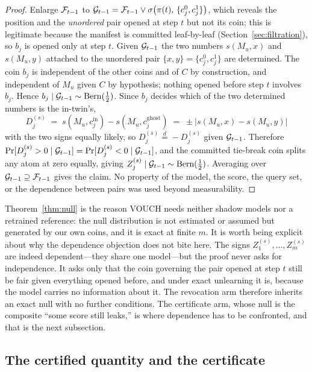 \begin{proof}
Enlarge $\mathcal{F}_{t-1}$ to $\mathcal{G}_{t-1} = \mathcal{F}_{t-1} \vee \sigma\bigl(\pi(t),\,
\{c_j^0, c_j^1\}\bigr)$, which reveals the position and the \emph{unordered} pair
opened at step $t$ but not its coin; this is legitimate because the manifest is
committed leaf-by-leaf (Section~\ref{sec:filtration}), so $b_j$ is opened only at
step $t$. Given $\mathcal{G}_{t-1}$ the two numbers $s(M_u, x)$ and $s(M_u, y)$ attached to
the unordered pair $\{x,y\}=\{c_j^0,c_j^1\}$ are determined. The coin $b_j$ is
independent of the other coins and of $C$ by construction, and independent of $M_u$
given $C$ by hypothesis; nothing opened before step $t$ involves $b_j$. Hence
$b_j \mid \mathcal{G}_{t-1} \sim \mathrm{Bern}(\tfrac12)$. Since $b_j$ decides which of the two
determined numbers is the in-twin's,
\[
D_j^{(s)} \;=\; s(M_u, c_j^{\text{in}}) - s(M_u, c_j^{\text{ghost}})
\;=\; \pm\bigl|s(M_u,x) - s(M_u,y)\bigr|
\]
with the two signs equally likely, so $D_j^{(s)} \overset{d}{=} -D_j^{(s)}$ given
$\mathcal{G}_{t-1}$. Therefore $\Pr[D_j^{(s)}>0\mid\mathcal{G}_{t-1}] = \Pr[D_j^{(s)}<0\mid\mathcal{G}_{t-1}]$,
and the committed tie-break coin splits any atom at zero equally, giving
$Z_j^{(s)}\mid\mathcal{G}_{t-1}\sim\mathrm{Bern}(\tfrac12)$. Averaging over $\mathcal{G}_{t-1}\supseteq\mathcal{F}_{t-1}$
gives the claim. No property of the model, the score, the query set, or the
dependence between pairs was used beyond measurability.
\end{proof}

Theorem~\ref{thm:null} is the reason VOUCH needs neither shadow models nor a
retrained reference: the null distribution is not estimated or assumed but generated
by our own coins, and it is exact at finite $m$. It is worth being explicit about why
the dependence objection does not bite here. The signs $Z_1^{(s)},\dots,Z_m^{(s)}$
are indeed dependent---they share one model---but the proof never asks for
independence. It asks only that the coin governing the pair opened at step $t$ still
be fair given everything opened before, and under exact unlearning it is, because the
model carries no information about it. The revocation arm therefore inherits an exact
null with no further conditions. The certificate arm, whose null is the composite
``some score still leaks,'' is where dependence has to be confronted, and that is the
next subsection.

\subsection{The certified quantity and the certificate}\label{sec:certquantity}

